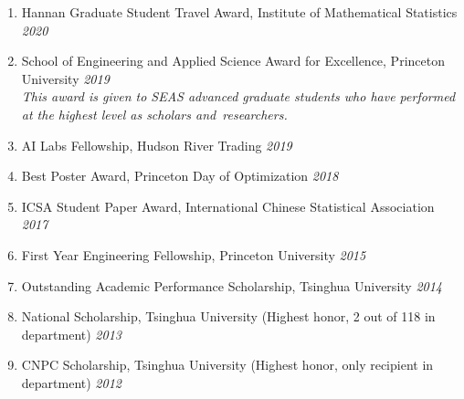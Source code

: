 \documentclass[a4paper, 10pt]{article}
\newenvironment{changemargin}[2]{%
  \begin{list}{}{%
    \setlength{\topsep}{0pt}%
    \setlength{\leftmargin}{#1}%
    \setlength{\rightmargin}{#2}%
    \setlength{\listparindent}{\parindent}%
    \setlength{\itemindent}{\parindent}%
    \setlength{\parsep}{\parskip}%
  }%
  \item[]}{\end{list}
}
\newenvironment{body} {
	\vspace*{-16pt}
	\begin{changemargin}{-0.3in}{-0.5in}
  }	
	{\end{changemargin}
}
\begin{document}
\begin{body}
    \vspace{18pt}
    \begin{enumerate}
    \item  Hannan Graduate Student Travel Award, Institute of Mathematical Statistics \hfill{} \emph{2020} \\
    \item {School of Engineering and Applied Science Award for Excellence}, Princeton University \hfill{} \emph{2019}\\
    {\em This award is given to SEAS advanced graduate students who have performed at the highest level as scholars and~researchers.} \\
    \smallskip
    \item {AI Labs Fellowship}, Hudson River Trading  \hfill{} \emph{2019}\\
    \smallskip
   \item {Best Poster Award}, Princeton Day of Optimization  \hfill{} \emph{2018}\\
     \smallskip
     \item {ICSA Student Paper Award}, International Chinese Statistical Association  \hfill{} \emph{2017}\\
     \smallskip
     \item  {First Year Engineering Fellowship}, Princeton University \hfill{} \emph{2015}\\
    \smallskip
    \item {Outstanding Academic Performance Scholarship}, Tsinghua University  \hfill{} \emph{2014}\\
    \smallskip
    \item {National Scholarship}, Tsinghua University (Highest honor, 2 out of 118 in department)\hfill{} \emph{2013}\\
    \smallskip
    \item {CNPC Scholarship}, Tsinghua University (Highest honor, only recipient in  department)\hfill{} \emph{2012}
    \end{enumerate}
\end{body}
\end{document}
